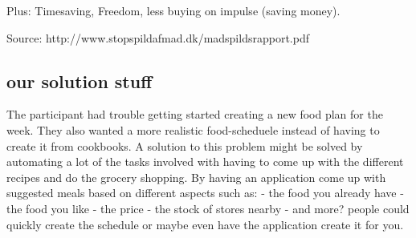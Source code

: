 Plus: Timesaving, Freedom, less buying on impulse (saving money).

Source: http://www.stopspildafmad.dk/madspildsrapport.pdf

\subsection{our solution stuff }
The participant had trouble getting started creating a new food plan for the week. They also wanted a more realistic food-scheduele instead of having to create it from cookbooks.
A solution to this problem might be solved by automating a lot of the tasks involved with having to come up with the different recipes and do the grocery shopping.
By having an application come up with suggested meals based on different aspects such as:
- the food you already have
- the food you like
- the price
- the stock of stores nearby
- and more?
people could quickly create the schedule or maybe even have the application create it for you.

